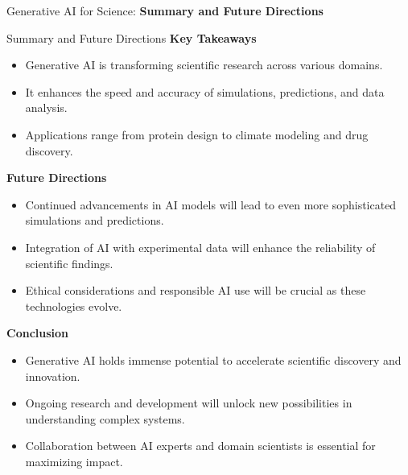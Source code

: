 \begin{frame}{}
    \LARGE Generative AI for Science: \textbf{Summary and Future Directions}
\end{frame}

\begin{frame}[allowframebreaks]{Summary and Future Directions}
    \textbf{Key Takeaways}
    \begin{itemize}
        \item Generative AI is transforming scientific research across various domains.
        \item It enhances the speed and accuracy of simulations, predictions, and data analysis.
        \item Applications range from protein design to climate modeling and drug discovery.
    \end{itemize}

    \framebreak

    \textbf{Future Directions}
    \begin{itemize}
        \item Continued advancements in AI models will lead to even more sophisticated simulations and predictions.
        \item Integration of AI with experimental data will enhance the reliability of scientific findings.
        \item Ethical considerations and responsible AI use will be crucial as these technologies evolve.
    \end{itemize}

    \framebreak

    \textbf{Conclusion}
    \begin{itemize}
        \item Generative AI holds immense potential to accelerate scientific discovery and innovation.
        \item Ongoing research and development will unlock new possibilities in understanding complex systems.
        \item Collaboration between AI experts and domain scientists is essential for maximizing impact.
    \end{itemize}
\end{frame}
